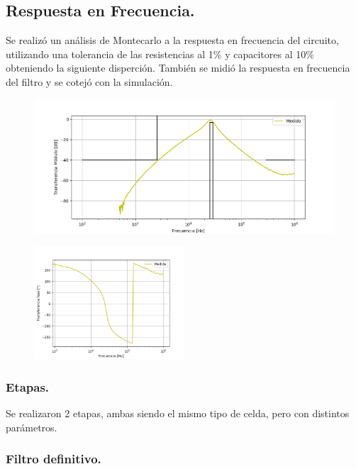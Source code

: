 \subsection{Respuesta en Frecuencia.}
Se realizó un análisis de Montecarlo a la respuesta en frecuencia del circuito, utilizando una tolerancia de las resistencias al 1$\%$ y capacitores al 10$\%$ obteniendo la siguiente disperción.
También se midió la respuesta en frecuencia del filtro y se cotejó con la simulación.
\begin{figure}[H]
	\centering
	\includegraphics[width=\textwidth]{Imagenes-Ej2/BodeRauch.png}
	\label{fig:graph}
\end{figure}
\begin{figure}[H]
	\centering
	\includegraphics[width=0.5\textwidth]{Imagenes-Ej2/BodeRauchFase.png}
	\label{fig:graph}
\end{figure}

\subsubsection{Etapas.}
Se realizaron 2 etapas, ambas siendo el mismo tipo de celda, pero con distintos parámetros.
\subsubsection{Filtro definitivo.}
%


